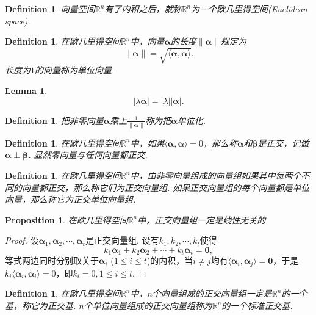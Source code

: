 \documentclass{article}
\newtheorem{lemma}[theorem]{Lemma}
\newtheorem{proposition}[theorem]{Proposition}
\newtheorem{definition}[theorem]{Definition}
\newcommand{\norm}[1]{\left\lVert#1\right\rVert} %
\newcommand{\mbf}[1]{\bm{#1}}
\newcommand\inp[2]{\langle #1, #2 \rangle} %
\begin{document}
\begin{definition}
\rm 向量空间$\mathbb{R}^n$有了内积之后，就称$\mathbb{R}^n$为一个欧几里得空间(Euclidean space).
\end{definition}

\begin{definition}
\rm 在欧几里得空间$\mathbb{R}^n$中，向量$\mbf{\alpha}$的长度$\norm{\mbf{\alpha}}$规定为
$$
\norm{\mbf{\alpha}} = \sqrt{\inp{\mbf{\alpha}}{\mbf{\alpha}}}.
$$
长度为$1$的向量称为单位向量. 
\end{definition}

\begin{lemma}
$$
|\lambda \mbf{\alpha}| = |\lambda||\mbf{\alpha}|.
$$
\end{lemma}

\begin{definition}
\rm 把非零向量$\mbf{\alpha}$乘上$\frac{1}{\norm{\mbf{\alpha}}}$称为把$\mbf{\alpha}$单位化.
\end{definition}

\begin{definition}
\rm 在欧几里得空间$\mathbb{R}^n$中，如果$\inp{\mbf{\alpha}}{\mbf{\alpha}}=0$，那么称$\mbf{\alpha}$和$\mbf{\beta}$是正交，记做$\mbf{\alpha} \perp \mbf{\beta}$. 显然零向量与任何向量都正交.
\end{definition}

\begin{definition}
\rm 在欧几里得空间$\mathbb{R}^n$中，由非零向量组成的向量组如果其中每两个不同的向量都正交，那么称它们为正交向量组. 如果正交向量组的每个向量都是单位向量，那么称它为正交单位向量组.
\end{definition}

\newpage
\begin{proposition}
\rm 在欧几里得空间$\mathbb{R}^n$中，正交向量组一定是线性无关的.
\end{proposition}

\begin{proof}
设$\mbf{\alpha}_1,\mbf{\alpha}_2,\cdots,\mbf{\alpha}_t$是正交向量组. 设有$k_1,k_2,\cdots,k_t$使得
$$
k_1\mbf{\alpha}_1 + k_2\mbf{\alpha}_2 + \cdots + k_t\mbf{\alpha}_t = \mbf{0},
$$
等式两边同时分别取关于$\mbf{\alpha}_i$ ($1\leq i \leq t$)的内积，当$i \neq j$均有$\inp{\mbf{\alpha}_i}{\mbf{\alpha}_j} = \mbf{0}$，于是$k_i\inp{\mbf{\alpha}_i}{\mbf{\alpha}_i} = 0$，即$k_i = 0, 1 \leq i \leq t$.
\end{proof}

\begin{definition}
\rm 在欧几里得空间$\mathbb{R}^n$中，$n$个向量组成的正交向量组一定是$\mathbb{R}^n$的一个基，称它为正交基. $n$个单位向量组成的正交向量组称为$\mathbb{R}^n$的一个标准正交基.
\end{definition}
\end{document}
